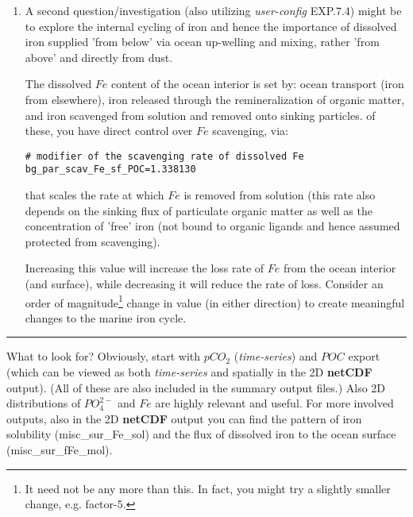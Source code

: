 \begin{enumerate}[noitemsep]
\newpage

\vspace{1mm}
\item A second question/investigation (also utilizing \textit{user-config} \textsf{\footnotesize EXP.7.4}) might be to explore the internal cycling of iron and hence the importance of dissolved iron supplied 'from below' via ocean up-welling and mixing, rather 'from above' and directly from dust.

\vspace{1mm}
The dissolved \(Fe\) content of the ocean interior is set by: ocean transport (iron from elsewhere), iron released through the remineralization of organic matter, and iron scavenged from solution and removed onto sinking particles. of these, you have direct control over \(Fe\) scavenging, via:
\vspace{-1mm}\small\begin{verbatim}
# modifier of the scavenging rate of dissolved Fe
bg_par_scav_Fe_sf_POC=1.338130
\end{verbatim}\normalsize\vspace{-1mm}
that scales the rate at which \(Fe\) is removed from solution (this rate also depends on the sinking flux of particulate organic matter as well as the concentration of 'free' iron (not bound to organic ligands and hence assumed protected from scavenging).

\vspace{1mm}
Increasing this value will increase the loss rate of \(Fe\) from the ocean interior (and surface), while decreasing it will reduce the rate of loss. Consider an order of magnitude\footnote{It need not be any more than this. In fact, you might try a slightly smaller change, e.g. factor-\(5\).} change in value (in either direction) to create meaningful changes to the marine iron cycle.

\end{enumerate}

\vspace{1mm}
\noindent\rule{4cm}{0.1mm}
\vspace{2mm}

\noindent What to look for? Obviously, start with \(pCO_{2}\) (\textit{time-series}) and \(POC\) export (which can be viewed as both \textit{time-series} and spatially in the 2D \textbf{netCDF} output). (All of these are also included in the summary output files.) Also 2D distributions of \(PO^{2-}_{4}\) and \(Fe\) are highly relevant and useful. For more involved outputs, also in the  2D \textbf{netCDF} output you can find the pattern of iron solubility (\textsf{\footnotesize misc\_sur\_Fe\_sol}) and the flux of dissolved iron to the ocean surface (\textsf{\footnotesize misc\_sur\_fFe\_mol}). 

